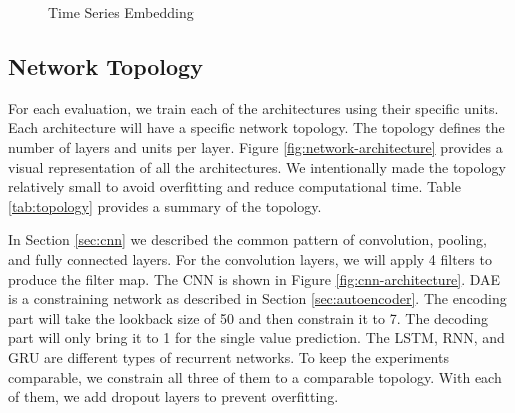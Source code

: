 \documentclass[11pt]{article}
\begin{document}
\begin{figure}[!ht]
	\centering
	\caption{Time Series Embedding}
	\label{fig:time-series-embedding}
\end{figure}


\subsection{Network Topology} \label{sec:network-topology}

For each evaluation, we train each of the architectures using their specific units. Each architecture will have a specific network topology. The topology defines the number of layers and units per layer. Figure \ref{fig:network-architecture} provides a visual representation of all the architectures. We intentionally made the topology relatively small to avoid overfitting and reduce computational time. Table \ref{tab:topology} provides a summary of the topology.

In Section \ref{sec:cnn} we described the common pattern of convolution, pooling, and fully connected layers. For the convolution layers, we will apply 4 filters to produce the filter map. The CNN is shown in Figure \ref{fig:cnn-architecture}.
DAE is a constraining network as described in Section \ref{sec:autoencoder}. The encoding part will take the lookback size of 50 and then constrain it to 7. The decoding part will only bring it to 1 for the single value prediction.
The LSTM, RNN, and GRU are different types of recurrent networks. To keep the experiments comparable, we constrain all three of them to a comparable topology. With each of them, we add dropout layers to prevent overfitting.
\end{document}
